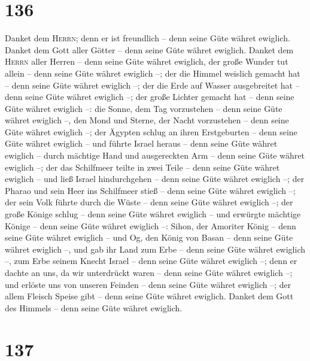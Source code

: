 \hypertarget{section-135}{%
\section{136}\label{section-135}}

 Danket dem \textsc{Herrn}; denn er ist freundlich -- denn
seine Güte währet ewiglich.  Danket dem Gott aller Götter
-- denn seine Güte währet ewiglich.  Danket dem
\textsc{Herrn} aller Herren -- denn seine Güte währet ewiglich,
 der große Wunder tut allein -- denn seine Güte währet
ewiglich --;  der die Himmel weislich gemacht hat -- denn
seine Güte währet ewiglich --;  der die Erde auf Wasser
ausgebreitet hat -- denn seine Güte währet ewiglich --; 
der große Lichter gemacht hat -- denn seine Güte währet ewiglich --:
 die Sonne, dem Tag vorzustehen -- denn seine Güte währet
ewiglich --,  den Mond und Sterne, der Nacht vorzustehen
-- denn seine Güte währet ewiglich --;  der Ägypten
schlug an ihren Erstgeburten -- denn seine Güte währet ewiglich --
 und führte Israel heraus -- denn seine Güte währet
ewiglich --  durch mächtige Hand und ausgereckten Arm --
denn seine Güte währet ewiglich --;  der das Schilfmeer
teilte in zwei Teile -- denn seine Güte währet ewiglich --
 und ließ Israel hindurchgehen -- denn seine Güte währet
ewiglich --;  der Pharao und sein Heer ins Schilfmeer
stieß -- denn seine Güte währet ewiglich --;  der sein
Volk führte durch die Wüste -- denn seine Güte währet ewiglich --;
 der große Könige schlug -- denn seine Güte währet
ewiglich --  und erwürgte mächtige Könige -- denn seine
Güte währet ewiglich --:  Sihon, der Amoriter König --
denn seine Güte währet ewiglich --  und Og, den König von
Basan -- denn seine Güte währet ewiglich --,  und gab ihr
Land zum Erbe -- denn seine Güte währet ewiglich --,  zum
Erbe seinem Knecht Israel -- denn seine Güte währet ewiglich --;
 denn er dachte an uns, da wir unterdrückt waren -- denn
seine Güte währet ewiglich --;  und erlöste uns von
unseren Feinden -- denn seine Güte währet ewiglich --; 
der allem Fleisch Speise gibt -- denn seine Güte währet ewiglich.
 Danket dem Gott des Himmels -- denn seine Güte währet
ewiglich.

\hypertarget{section-136}{%
\section{137}\label{section-136}}

